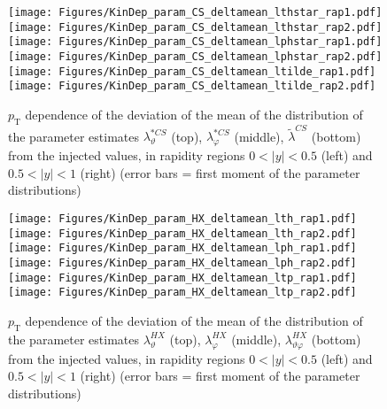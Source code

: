 \documentclass[12pt]{article}
\newcommand{\pT}{p_\mathrm{T}}
\newcommand{\absy}{\left |  y \right |}
\newcommand{\lamtildeCS}{\tilde{\lambda}^{\scriptscriptstyle CS}}
\newcommand{\lamthstarCS}{\lambda^{* \scriptscriptstyle CS}_\vartheta}
\newcommand{\lamphstarCS}{\lambda^{* \scriptscriptstyle CS}_\varphi}
\newcommand{\lamthHX}{\lambda^{\scriptscriptstyle HX}_\vartheta}
\newcommand{\lamphHX}{\lambda^{\scriptscriptstyle HX}_\varphi}
\newcommand{\lamthphHX}{\lambda^{\scriptscriptstyle HX}_{\vartheta \varphi}}
\begin{document}
\begin{figure}[htbp]
\centering
\texttt{[image: Figures/KinDep\_param\_CS\_deltamean\_lthstar\_rap1.pdf]}
\texttt{[image: Figures/KinDep\_param\_CS\_deltamean\_lthstar\_rap2.pdf]}
\texttt{[image: Figures/KinDep\_param\_CS\_deltamean\_lphstar\_rap1.pdf]}
\texttt{[image: Figures/KinDep\_param\_CS\_deltamean\_lphstar\_rap2.pdf]}
\texttt{[image: Figures/KinDep\_param\_CS\_deltamean\_ltilde\_rap1.pdf]}
\texttt{[image: Figures/KinDep\_param\_CS\_deltamean\_ltilde\_rap2.pdf]}
\caption{$\pT$ dependence of the deviation of the mean of the distribution of
the parameter estimates $\lamthstarCS$ (top), $\lamphstarCS$ (middle),
$\lamtildeCS$ (bottom) from the injected values, in rapidity regions
$0<\absy<0.5$ (left) and $0.5<\absy<1$ (right) (error bars = first moment of
the parameter distributions)}
\end{figure}
\clearpage









\begin{figure}[htbp]
\centering
\texttt{[image: Figures/KinDep\_param\_HX\_deltamean\_lth\_rap1.pdf]}
\texttt{[image: Figures/KinDep\_param\_HX\_deltamean\_lth\_rap2.pdf]}
\texttt{[image: Figures/KinDep\_param\_HX\_deltamean\_lph\_rap1.pdf]}
\texttt{[image: Figures/KinDep\_param\_HX\_deltamean\_lph\_rap2.pdf]}
\texttt{[image: Figures/KinDep\_param\_HX\_deltamean\_ltp\_rap1.pdf]}
\texttt{[image: Figures/KinDep\_param\_HX\_deltamean\_ltp\_rap2.pdf]}
\caption{$\pT$ dependence of the deviation of the mean of the distribution of
the parameter estimates $\lamthHX$ (top), $\lamphHX$ (middle), $\lamthphHX$
(bottom) from the injected values, in rapidity regions $0<\absy<0.5$ (left) and
$0.5<\absy<1$ (right) (error bars = first moment of the parameter
distributions)}
\end{figure}
\clearpage
\end{document}

